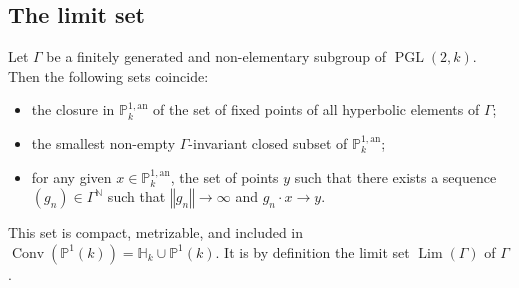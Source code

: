 \documentclass[AHL,Unicode,longabstracts]{cedram}
\DeclareMathOperator{\conv}{Conv}
\DeclareMathOperator{\Lm}{Lim}
\DeclareMathOperator{\PGL}{PGL}
\newcommand{\nn}{\mathbb{N}}
\newcommand{\hh}{\mathbb{H}}
\newcommand{\an}{\mathrm{an}}
\newcommand{\norm}[1]{\left\Vert#1\right\Vert}
\newcommand{\PP}{\mathbb{P}}
\newcommand{\PGLk}{\PGL(2, k)}
\begin{document}
\subsection{The limit set}

\begin{theo}\label{thm:struct limit}
Let $\Gamma$ be a finitely generated and non-elementary subgroup of $\PGLk$. Then the following sets coincide:
\begin{itemize}
\item the closure in $\PP^{1,\an}_k$ of the set of fixed points of all hyperbolic elements of $\Gamma$;
\item the smallest non-empty $\Gamma$-invariant closed subset of $\PP^{1,\an}_k$;
\item for any given $x\in \PP^{1,\an}_k$, the set of points $y$ such that there exists a sequence $(g_n)\in \Gamma^\nn$ such that $\norm{g_n}\to\infty$ and $g_n \cdot x \to y$.
\end{itemize}
This set is compact, metrizable, and included in $\conv(\PP^1(k)) =\hh_k \cup \PP^1(k)$. It is by definition the limit set $\Lm(\Gamma)$ of $\Gamma$.
\end{theo}
\end{document}
